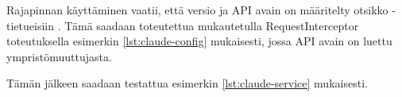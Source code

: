 Rajapinnan käyttäminen vaatii, että versio ja API avain on määritelty otsikko
-tietueisiin \parencite{anthropicAPIDocsVersions}
\parencite{anthropicAPIDocsGettingStarted}. Tämä saadaan toteutettua
mukautetulla RequestInterceptor toteutuksella esimerkin \ref{lst:claude-config}
mukaisesti, jossa API avain on luettu ympristömuuttujasta.



Tämän jälkeen saadaan testattua esimerkin \ref{lst:claude-service} mukaisesti.


